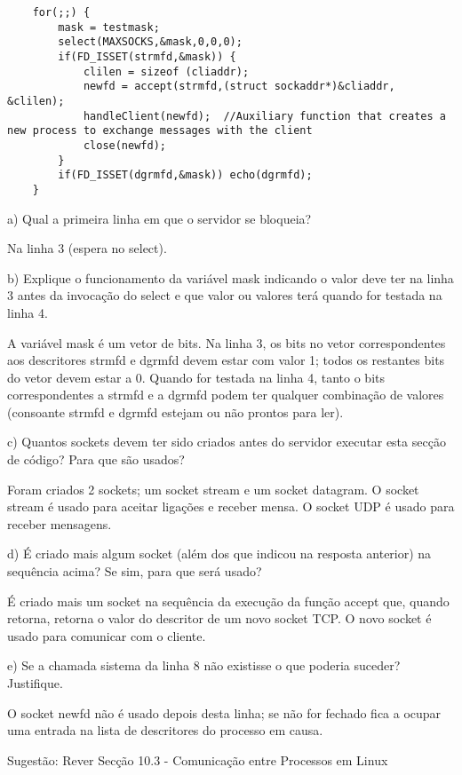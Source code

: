 \documentclass[11pt]{article}
\begin{document}
\begin{lstlisting}
    for(;;) {
        mask = testmask;
        select(MAXSOCKS,&mask,0,0,0);
        if(FD_ISSET(strmfd,&mask)) {
            clilen = sizeof (cliaddr);
            newfd = accept(strmfd,(struct sockaddr*)&cliaddr, &clilen);
            handleClient(newfd);  //Auxiliary function that creates a new process to exchange messages with the client
            close(newfd);
        }
        if(FD_ISSET(dgrmfd,&mask)) echo(dgrmfd);
    }
\end{lstlisting}

a) Qual a primeira linha em que o servidor se bloqueia?

Na linha 3 (espera no select).

b) Explique o funcionamento da variável mask indicando o valor deve ter na linha 3 antes da invocação do select e que valor ou valores terá quando for testada na linha 4.

A variável mask é um vetor de bits. Na linha 3, os bits no vetor correspondentes aos descritores strmfd e dgrmfd devem estar com valor 1; todos os restantes bits do vetor devem estar a 0. Quando for testada na linha 4, tanto o bits correspondentes a strmfd e a dgrmfd podem ter qualquer combinação de valores (consoante strmfd e dgrmfd estejam ou não prontos para ler).

c) Quantos sockets devem ter sido criados antes do servidor executar esta secção de código? Para que são usados?

Foram criados 2 sockets; um socket stream e um socket datagram. O socket stream é usado para aceitar ligações e receber mensa. O socket UDP é usado para receber mensagens.

d) É criado mais algum socket (além dos que indicou na resposta anterior) na sequência acima? Se sim, para que será usado?

É criado mais um socket na sequência da execução da função accept que, quando retorna, retorna o valor do descritor de um novo socket TCP. O novo socket é usado para comunicar com o cliente.

e) Se a chamada sistema da linha 8 não existisse o que poderia suceder? Justifique.

O socket newfd não é usado depois desta linha; se não for fechado fica a ocupar uma entrada na lista de descritores do processo em causa.

Sugestão: Rever Secção 10.3 - Comunicação entre Processos em Linux
\end{document}

